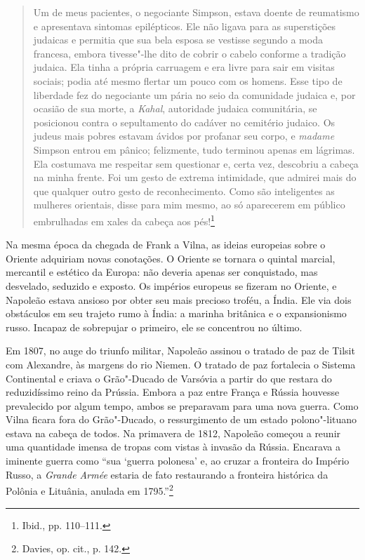 \begin{quote}
Um de meus pacientes, o negociante Simpson, estava doente de reumatismo
e apresentava sintomas epilépticos. Ele não ligava para as superstições
judaicas e permitia que sua bela esposa se vestisse segundo a moda
francesa, embora tivesse"-lhe dito de cobrir o cabelo conforme a tradição
judaica. Ela tinha a própria carruagem e era livre para sair em visitas
sociais; podia até mesmo flertar um pouco com os homens. Esse tipo de
liberdade fez do negociante um pária no seio da comunidade judaica e,
por ocasião de sua morte, a \textit{Kahal}, autoridade judaica comunitária, se
posicionou contra o sepultamento do cadáver no cemitério judaico. Os
judeus mais pobres estavam ávidos por profanar seu corpo, e \textit{madame}
Simpson entrou em pânico; felizmente, tudo terminou apenas em lágrimas.
Ela costumava me respeitar sem questionar e, certa vez, descobriu a
cabeça na minha frente. Foi um gesto de extrema intimidade, que admirei
mais do que qualquer outro gesto de reconhecimento. Como são
inteligentes as mulheres orientais, disse para mim mesmo, ao só
aparecerem em público embrulhadas em xales da cabeça aos pés!\footnote{Ibid., pp. 110--111.} \end{quote}

Na mesma época da chegada de Frank a Vilna, as ideias europeias sobre o
Oriente adquiriam novas conotações. O Oriente se tornara o quintal
marcial, mercantil e estético da Europa: não deveria apenas ser
conquistado, mas desvelado, seduzido e exposto. Os impérios europeus se
fizeram no Oriente, e Napoleão estava ansioso por obter seu mais
precioso troféu, a Índia. Ele via dois obstáculos em seu trajeto rumo à
Índia: a marinha britânica e o expansionismo russo. Incapaz de
sobrepujar o primeiro, ele se concentrou no último.

Em 1807, no auge do triunfo militar, Napoleão assinou o tratado de paz
de Tilsit com Alexandre, às margens do rio Niemen. O tratado de paz
fortalecia o Sistema Continental e criava o Grão"-Ducado de Varsóvia a
partir do que restara do reduzidíssimo reino da Prússia. Embora a paz
entre França e Rússia houvesse prevalecido por algum tempo, ambos se
preparavam para uma nova guerra. Como Vilna ficara fora do Grão"-Ducado,
o ressurgimento de um estado polono"-lituano estava na cabeça de todos.
Na primavera de 1812, Napoleão começou a reunir uma quantidade imensa de
tropas com vistas à invasão da Rússia. Encarava a iminente guerra como
``sua `guerra polonesa' e, ao cruzar a fronteira do Império Russo, a
\textit{Grande Armée} estaria de fato restaurando a fronteira histórica da
Polônia e Lituânia, anulada em 1795.''\footnote{Davies, op. cit., p. 142.}

